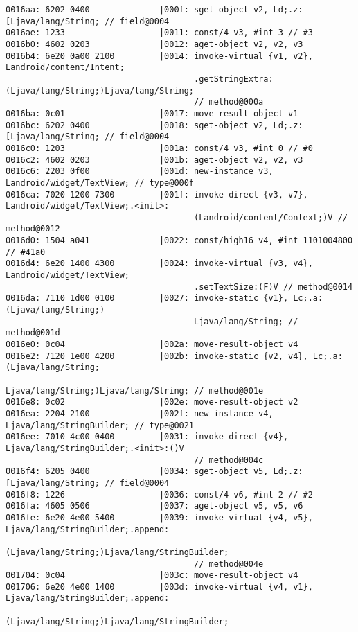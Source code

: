 \begin{lstlisting}
0016aa: 6202 0400              |000f: sget-object v2, Ld;.z:[Ljava/lang/String; // field@0004
0016ae: 1233                   |0011: const/4 v3, #int 3 // #3
0016b0: 4602 0203              |0012: aget-object v2, v2, v3
0016b4: 6e20 0a00 2100         |0014: invoke-virtual {v1, v2}, Landroid/content/Intent;
                                      .getStringExtra:(Ljava/lang/String;)Ljava/lang/String;
                                      // method@000a
0016ba: 0c01                   |0017: move-result-object v1
0016bc: 6202 0400              |0018: sget-object v2, Ld;.z:[Ljava/lang/String; // field@0004
0016c0: 1203                   |001a: const/4 v3, #int 0 // #0
0016c2: 4602 0203              |001b: aget-object v2, v2, v3
0016c6: 2203 0f00              |001d: new-instance v3, Landroid/widget/TextView; // type@000f
0016ca: 7020 1200 7300         |001f: invoke-direct {v3, v7}, Landroid/widget/TextView;.<init>:
                                      (Landroid/content/Context;)V // method@0012
0016d0: 1504 a041              |0022: const/high16 v4, #int 1101004800 // #41a0
0016d4: 6e20 1400 4300         |0024: invoke-virtual {v3, v4}, Landroid/widget/TextView;
                                      .setTextSize:(F)V // method@0014
0016da: 7110 1d00 0100         |0027: invoke-static {v1}, Lc;.a:(Ljava/lang/String;)
                                      Ljava/lang/String; // method@001d
0016e0: 0c04                   |002a: move-result-object v4
0016e2: 7120 1e00 4200         |002b: invoke-static {v2, v4}, Lc;.a:(Ljava/lang/String;
                                      Ljava/lang/String;)Ljava/lang/String; // method@001e
0016e8: 0c02                   |002e: move-result-object v2
0016ea: 2204 2100              |002f: new-instance v4, Ljava/lang/StringBuilder; // type@0021
0016ee: 7010 4c00 0400         |0031: invoke-direct {v4}, Ljava/lang/StringBuilder;.<init>:()V
                                      // method@004c
0016f4: 6205 0400              |0034: sget-object v5, Ld;.z:[Ljava/lang/String; // field@0004
0016f8: 1226                   |0036: const/4 v6, #int 2 // #2
0016fa: 4605 0506              |0037: aget-object v5, v5, v6
0016fe: 6e20 4e00 5400         |0039: invoke-virtual {v4, v5}, Ljava/lang/StringBuilder;.append:
                                      (Ljava/lang/String;)Ljava/lang/StringBuilder;
                                      // method@004e
001704: 0c04                   |003c: move-result-object v4
001706: 6e20 4e00 1400         |003d: invoke-virtual {v4, v1}, Ljava/lang/StringBuilder;.append:
                                      (Ljava/lang/String;)Ljava/lang/StringBuilder;

\end{lstlisting}
